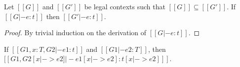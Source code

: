 \begin{comment}
\begin{lemma}[Free Variable]\label{lem:appendix:free}
    If $[[G |- e:t]]$, then $\FV(e) \subseteq \dom([[G]])$ and $\FV([[t]])
\subseteq \dom([[G]])$.
\end{lemma}

\begin{proof}
    By induction on the derivation of $[[G |- e:t]]$. We only treat cases
\ruleref{T\_Mu}, \ruleref{T\_CastUp} and \ruleref{T\_CastDown} (since proofs of
other cases are the same as \cc \cite{handbook}):
    \begin{description}
        \item[Case \ruleref{T\_Mu}:] From premises of $[[G |- (mu x:t.e1) :
t]]$, by the induction hypothesis, we have $\FV(e_1) \subseteq \dom([[G]]) \cup
\{[[x]]\}$ and $\FV(\tau) \subseteq \dom([[G]])$. Thus the result follows by
$\FV([[mu x:t.e1]])=\FV(e_1) \setminus \{[[x]]\} \subseteq \dom([[G]])$ and
$\FV(\tau) \subseteq \dom([[G]])$.
        \item[Case \ruleref{T\_CastUp}:] Since $\FV([[castup [t]
e1]])=\FV([[e1]])$, the result follows directly by the induction hypothesis.
        \item[Case \ruleref{T\_CastDown}:] Since $\FV([[castdown
e1]])=\FV([[e1]])$, the result follows directly by the induction hypothesis.
    \end{description}
\end{proof}
\end{comment}

\begin{lemma}[Thinning]\label{lem:appendix:thin}
    Let $[[G]]$ and $[[G']]$ be legal contexts such that $[[G]] \subseteq
[[G']]$. If $[[G |- e : t]]$ then $[[G' |- e : t]]$.
\end{lemma}

\begin{proof}
    By trivial induction on the derivation of $[[G |- e : t]]$.
\end{proof}

\begin{lemma}[Substitution]\label{lem:appendix:subst}
	If $[[G1, x:T, G2 |- e1:t]]$ and $[[G1 |- e2:T]]$, then $[[G1, G2 [x |-> e2]
|- e1[x |-> e2]  : t[x |-> e2] ]]$.
\end{lemma}

